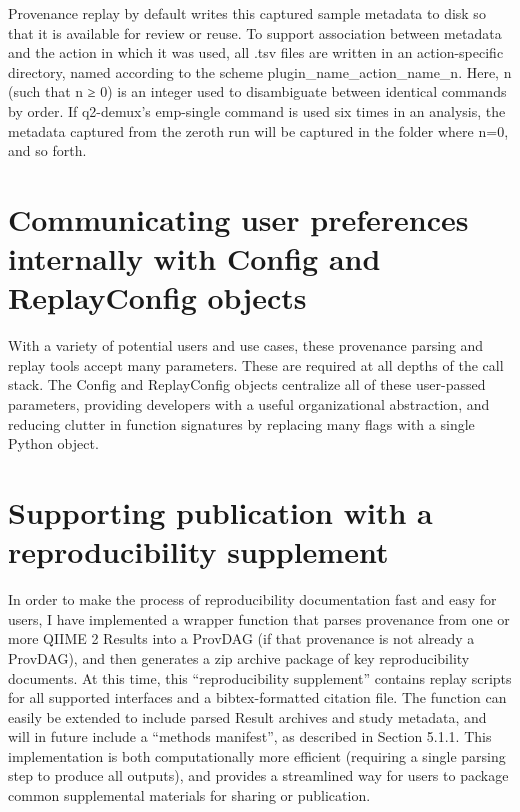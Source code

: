 Provenance replay by default writes this captured sample metadata to disk so
that it is available for review or reuse. To support association between
metadata and the action in which it was used, all .tsv files are written in an
action-specific directory, named according to the scheme
plugin\_name\_action\_name\_n. Here, n (such that n ≥ 0) is an integer used to
disambiguate between identical commands by order. If q2-demux’s emp-single
command is used six times in an analysis, the metadata captured from the zeroth
run will be captured in the folder where n=0, and so forth.

\section{Communicating user preferences internally with Config and ReplayConfig objects}

With a variety of potential users and use cases, these provenance parsing and
replay tools accept many parameters. These are required at all depths of the
call stack. The Config and ReplayConfig objects centralize all of these
user-passed parameters, providing developers with a useful organizational
abstraction, and reducing clutter in function signatures by replacing many flags
with a single Python object. 

\section{Supporting publication with a reproducibility supplement}

In order to make the process of reproducibility documentation fast and easy for
users, I have implemented a wrapper function that parses provenance from one or
more QIIME 2 Results into a ProvDAG (if that provenance is not already a
ProvDAG), and then generates a zip archive package of key reproducibility
documents. At this time, this “reproducibility supplement” contains replay
scripts for all supported interfaces and a bibtex-formatted citation file. The
function can easily be extended to include parsed Result archives and study
metadata, and will in future include a “methods manifest”, as described in
Section 5.1.1. This implementation is both computationally more efficient
(requiring a single parsing step to produce all outputs), and provides a
streamlined way for users to package common supplemental materials for sharing
or publication.

